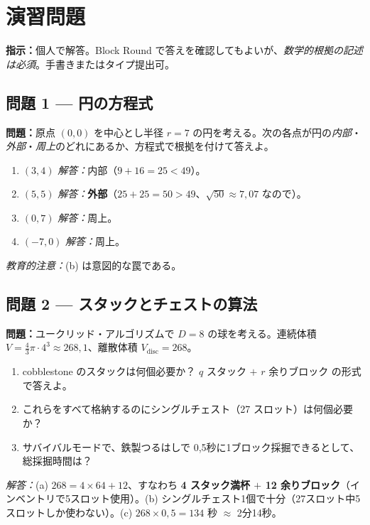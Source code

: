 \documentclass[12pt,a4paper]{scrartcl}
\newcommand{\acc}[1]{\textcolor{accent}{\textbf{#1}}}
\begin{document}
\newpage
\section{演習問題}\label{ap:exerc}

\textbf{指示：}個人で解答。Block Round で答えを確認してもよいが、\emph{数学的根拠の記述は必須}。手書きまたはタイプ提出可。

\subsection*{問題 1 --- 円の方程式}
\textbf{問題：}原点 $(0, 0)$ を中心とし半径 $r = 7$ の円を考える。次の各点が円の\emph{内部}・\emph{外部}・\emph{周上}のどれにあるか、方程式で根拠を付けて答えよ。
\begin{enumerate}[label=\alph*),leftmargin=1.5em,itemsep=0.1em,topsep=0.2em,nosep]
  \item $(3, 4)$ \hfill \emph{解答：}内部（$9 + 16 = 25 < 49$）。
  \item $(5, 5)$ \hfill \emph{解答：}\acc{外部}（$25 + 25 = 50 > 49$、$\sqrt{50} \approx 7{,}07$ なので）。
  \item $(0, 7)$ \hfill \emph{解答：}周上。
  \item $(-7, 0)$ \hfill \emph{解答：}周上。
\end{enumerate}

\textit{教育的注意：}(b) は意図的な罠である。

\subsection*{問題 2 --- スタックとチェストの算法}
\textbf{問題：}ユークリッド・アルゴリズムで $D = 8$ の球を考える。連続体積 $V = \tfrac{4}{3}\pi \cdot 4^3 \approx 268{,}1$、離散体積 $V_{\mathrm{disc}} = 268$。
\begin{enumerate}[label=\alph*),leftmargin=1.5em,itemsep=0.1em,topsep=0.2em,nosep]
  \item cobblestone のスタックは何個必要か？ $q$ スタック $+$ $r$ 余りブロック の形式で答えよ。
  \item これらをすべて格納するのにシングルチェスト（27 スロット）は何個必要か？
  \item サバイバルモードで、鉄製つるはしで 0,5秒に1ブロック採掘できるとして、総採掘時間は？
\end{enumerate}

\emph{解答：}(a) $268 = 4 \times 64 + 12$、すなわち \acc{4 スタック満杯 $+$ 12 余りブロック}（インベントリで5スロット使用）。(b) シングルチェスト1個で十分（27スロット中5スロットしか使わない）。(c) $268 \times 0{,}5 = 134$ 秒 $\approx$ 2分14秒。
\end{document}
